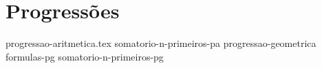 \chapter{Progressões}
{
    \newcommand{\chapterdir}{../capitulos/progressoes/}

    {progressao-aritmetica.tex}
    {somatorio-n-primeiros-pa}
    {progressao-geometrica}
    {formulas-pg}
    {somatorio-n-primeiros-pg}
}